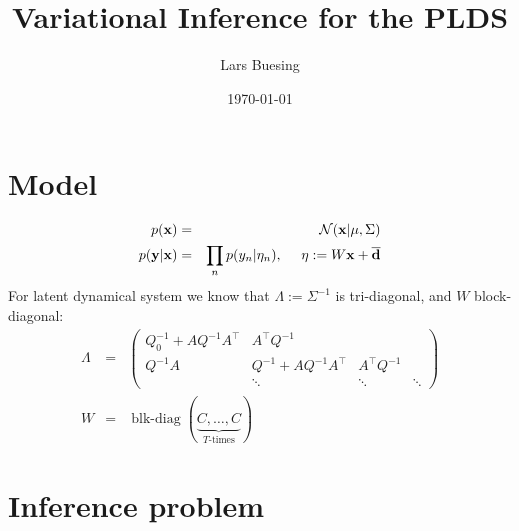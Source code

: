 \documentclass[10pt,english]{article}
\title{Variational Inference for the PLDS}
\author{Lars Buesing}
\date{\today}
\begin{document}
\maketitle

\section{Model}

\begin{eqnarray}
 p(\xb)				&=&	\Normal(\xb\vert \mu,\Sigma)\\
 p(\yb\vert \xb)		&=&	\prod_{n}	p(y_n\vert \eta_n), \ \ \ \ \eta:=W\xb+\overline{\db}
\end{eqnarray}
For latent dynamical system we know that $\Lambda:=\Sigma^{-1}$ is tri-diagonal, and $W$ block-diagonal:
\begin{eqnarray}
 \Lambda	&=&	\begin{pmatrix} Q_0^{-1}+AQ^{-1}A^\top	&	A^\top Q^{-1}		& \\
					Q^{-1}A			&	Q^{-1}+AQ^{-1}A^\top 	&  A^\top Q^{-1}\\
								&	\ddots			& \ddots		& \ddots
        	   	\end{pmatrix}\\
 W		&=&	\operatorname{blk-diag}(\underbrace{C,\ldots,C}_{T\mbox{-times}})
\end{eqnarray}



\section{Inference problem}
\end{document}
